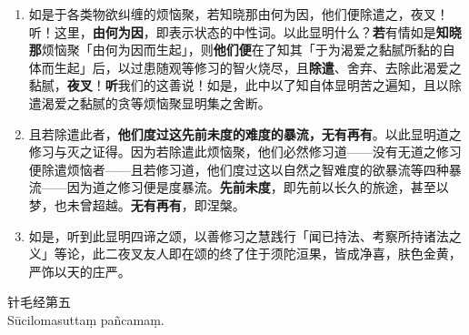 \begin{enumerate}\item 如是于各类物欲纠缠的烦恼聚，若知晓那由何为因，他们便除遣之，夜叉！听！这里，\textbf{由何为因}，即表示状态的中性词。以此显明什么？\textbf{若}有情如是\textbf{知晓那}烦恼聚「由何为因而生起」，则\textbf{他们便}在了知其「于为渴爱之黏腻所黏的自体而生起」后，以过患随观等修习的智火烧尽，且\textbf{除遣}、舍弃、去除此渴爱之黏腻，\textbf{夜叉}！\textbf{听}我们的这善说！如是，此中以了知自体显明苦之遍知，且以除遣渴爱之黏腻的贪等烦恼聚显明集之舍断。
\item 且若除遣此者，\textbf{他们度过这先前未度的难度的暴流，无有再有}。以此显明道之修习与灭之证得。因为若除遣此烦恼聚，他们必然修习道——没有无道之修习便除遣烦恼者——且若修习道，他们度过这以自然之智难度的欲暴流等四种暴流——因为道之修习便是度暴流。\textbf{先前未度}，即先前以长久的旅途，甚至以梦，也未曾超越。\textbf{无有再有}，即涅槃。
\item 如是，听到此显明四谛之颂，以善修习之慧践行「闻已持法、考察所持诸法之义」等论，此二夜叉友人即在颂的终了住于须陀洹果，皆成净喜，肤色金黄，严饰以天的庄严。\end{enumerate}

\begin{center}\vspace{1em}针毛经第五\\Sūcilomasuttaṃ pañcamaṃ.\end{center}